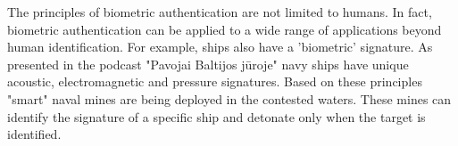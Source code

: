 \hspace{1 em} The principles of biometric authentication are not limited to humans. In fact, 
biometric authentication can be applied to a wide range of applications beyond 
human identification. For example, ships also have a 'biometric' signature. As presented in 
the podcast "Pavojai Baltijos jūroje"\cite{podcast} navy ships have unique acoustic, electromagnetic
and pressure signatures. Based on these principles "smart" naval mines are being deployed in the contested waters.
These mines can identify the signature of a specific ship and detonate only when the target is identified.